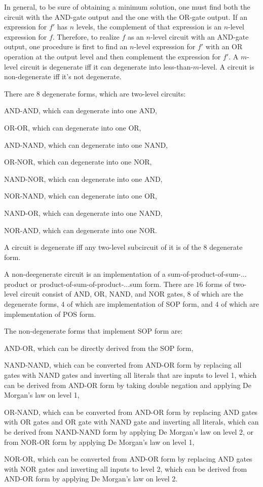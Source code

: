 \documentclass[a4paper,12pt]{report}
\begin{document}
In general, to be sure of obtaining a minimum solution, one must find both the circuit with the AND-gate output and the one with the OR-gate output. If an expression for $f'$ has $n$ levels, the complement of that expression is an $n$-level expression for $f$. Therefore, to realize $f$ as an $n$-level circuit with an AND-gate output, one procedure is first to find an $n$-level expression for $f'$ with an OR operation at the output level and then complement the expression for $f'$.
A $m$-level circuit is degenerate iff it can degenerate into less-than-$m$-level. A circuit is non-degenerate iff it's not degenerate.

There are $8$ degenerate forms, which are two-level circuits:
\bit
\item AND-AND, which can degenerate into one AND,
\item OR-OR, which can degenerate into one OR,
\item AND-NAND, which can degenerate into one NAND,
\item OR-NOR, which can degenerate into one NOR,
\item NAND-NOR, which can degenerate into one AND,
\item NOR-NAND, which can degenerate into one OR,
\item NAND-OR, which can degenerate into one NAND,
\item NOR-AND, which can degenerate into one NOR.
\eit

A circuit is degenerate iff any two-level subcircuit of it is of the $8$ degenerate form.

A non-deegenerate circuit is an implementation of a sum-of-product-of-sum-$\ldots$product or product-of-sum-of-product-$\ldots$sum form.
There are $16$ forms of two-level circuit consist of AND, OR, NAND, and NOR gates, $8$ of which are the degenerate forms, $4$ of which are implementation of SOP form, and $4$ of which are implementation of POS form.

The non-degenerate forms that implement SOP form are:
\bit
\item AND-OR, which can be directly derived from the SOP form,
\item NAND-NAND, which can be converted from AND-OR form by replacing all gates with NAND gates and inverting all literals that are inputs to level 1, which can be derived from AND-OR form by taking double negation and applying De Morgan's law on level 1,
\item OR-NAND, which can be converted from AND-OR form by replacing AND gates with OR gates and OR gate with NAND gate and inverting all literals, which can be derived from NAND-NAND form by applying De Morgan's law on level 2, or from NOR-OR form by applying De Morgan's law on level 1,
\item NOR-OR, which can be converted from AND-OR form by replacing AND gates with NOR gates and inverting all inputs to level 2, which can be derived from AND-OR form by applying De Morgan's law on level 2.
\eit
\end{document}
